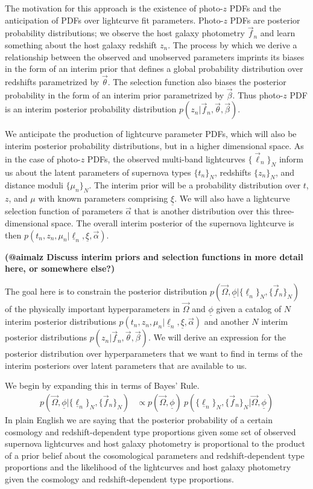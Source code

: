 \documentclass[12pt, onecolumn]{emulateapj}
\newcommand{\textul}{\underline}
\begin{document}
The motivation for this approach is the existence of photo-$z$ PDFs and the anticipation of PDFs over lightcurve fit parameters.  Photo-$z$ PDFs are posterior probability distributions; we observe the host galaxy photometry $\vec{f}_{n}$ and learn something about the host galaxy redshift $z_{n}$.  The process by which we derive a relationship between the observed and unobserved parameters imprints its biases in the form of an interim prior that defines a global probability distribution over redshifts parametrized by $\vec{\theta}$.  The selection function also biases the posterior probability in the form of an interim prior parametrized by $\vec{\beta}$.  Thus photo-$z$ PDF is an interim posterior probability distribution $p(z_{n} | \vec{f}_{n}, \vec{\theta}, \vec{\beta})$.

We anticipate the production of lightcurve parameter PDFs, which will also be interim posterior probability distributions, but in a higher dimensional space.  As in the case of photo-$z$ PDFs, the observed multi-band lightcurves $\{\vec{\ell}_{n}\}_{N}$ inform us about the latent parameters of supernova types $\{t_{n}\}_{N}$, redshifts $\{z_{n}\}_{N}$, and distance moduli $\{\mu_{n}\}_{N}$.  The interim prior will be a probability distribution over $t$, $z$, and $\mu$ with known parameters comprising $\textul{\xi}$.  We will also have a lightcurve selection function of parameters $\vec{\alpha}$ that is another distribution over this three-dimensional space.  The overall interim posterior of the supernova lightcurve is then $p(t_{n}, z_{n}, \mu_{n} | \textul{\ell}_{n}, \textul{\xi}, \vec{\alpha})$.

\textbf{(@aimalz Discuss interim priors and selection functions in more detail here, or somewhere else?)}

The goal here is to constrain the posterior distribution $p(\vec{\Omega}, \textul{\phi} | \{\textul{\ell}_{n}\}_{N}, \{\vec{f}_{n}\}_{N})$ of the physically important hyperparameters in $\vec{\Omega}$ and $\textul{\phi}$ given a catalog of $N$ interim posterior distributions $p(t_{n}, z_{n}, \mu_{n} | \textul{\ell}_{n}, \textul{\xi}, \vec{\alpha})$ and another $N$ interim posterior distributions $p(z_{n} | \vec{f}_{n}, \vec{\theta}, \vec{\beta})$.  We will derive an expression for the posterior distribution over hyperparameters that we want to find in terms of the interim posteriors over latent parameters that are available to us.

We begin by expanding this in terms of Bayes' Rule.
\begin{align}
\label{eq:bayes}
p(\vec{\Omega}, \textul{\phi} | \{\textul{\ell}_{n}\}_{N}, \{\vec{f}_{n}\}_{N}) &\propto p(\vec{\Omega}, \textul{\phi})\ p(\{\textul{\ell}_{n}\}_{N}, \{\vec{f}_{n}\}_{N} | \vec{\Omega}, \textul{\phi})
\end{align}
In plain English we are saying that the posterior probability of a certain cosmology and redshift-dependent type proportions given some set of observed supernova lightcurves and host galaxy photometry is proportional to the product of a prior belief about the cosomological parameters and redshift-dependent type proportions and the likelihood of the lightcurves and host galaxy photometry given the cosmology and redshift-dependent type proportions.
\end{document}
